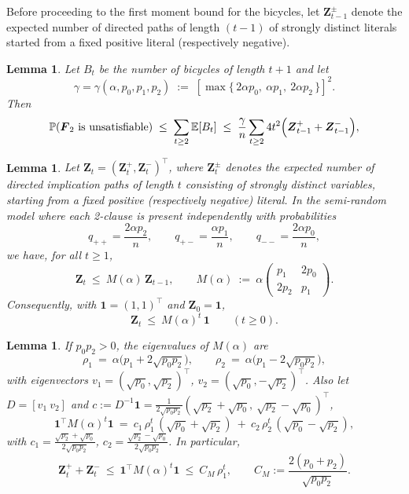 \documentclass[11pt,reqno]{amsart}
\numberwithin{equation}{section}
\renewcommand{\vec}[1]{\boldsymbol{#1}}
\newcommand\vF{\vec F}
\newcommand\vZ{\vec Z}
\newcommand\Erw{\mathbb{E}}
\newcommand\ex{\Erw}
\newcommand\pr{\mathbb{P}}
\renewcommand\Pr{\pr}
\newtheorem{lemma}[definition]{Lemma}
\def\pr{{\mathbb P}}
\begin{document}
Before proceeding to the first moment bound for the bicycles, let $\vZ^\pm_{t-1}$ denote the expected number of directed paths of length $\left(t-1\right)$ of strongly distinct literals started from a fixed positive literal (respectively negative).
\begin{lemma}\label{lem:hooked-count}
	Let $B_t$ be the number of bicycles of length $t+1$ 
	and let
	\[
	\gamma=\gamma(\alpha,p_0,p_1,p_2)\;:=\;[\max\{\,2\alpha p_0,\ \alpha p_1,\ 2\alpha p_2\,\}]^2.
	\]
	Then
	\[
	\Pr(\text{$\vF_2$ is unsatisfiable}) \;\le\; \sum_{t\ge 2}\ex[ B_t]
	\;\le\; 
	\frac{\gamma}{n}\sum_{t\ge 2}4t^2\Bigl(\vZ^+_{t-1}+\vZ^-_{t-1}\Bigr),
	\]
\end{lemma}
\begin{lemma}\label{lem_sen}
	Let $\vZ_t=(\vZ_t^+,\vZ_t^-)^\top$, where $\vZ_t^\pm$ denotes the expected number of
	directed implication paths of length $t$ consisting of \emph{strongly distinct}
	variables, starting from a fixed positive (respectively negative) literal.
	In the semi-random model where each 2-clause is present independently with probabilities
	\[
	q_{++}=\frac{2\alpha p_2}{n},\qquad
	q_{+-}=\frac{\alpha p_1}{n},\qquad
	q_{--}=\frac{2\alpha p_0}{n},
	\]
	we have, for all $t\ge 1$,
	\[
	\vZ_t \ \le\ M(\alpha)\,\vZ_{t-1},\qquad
	M(\alpha)\ :=\ \alpha\begin{pmatrix} p_1 & 2p_0\\[2pt] 2p_2 & p_1\end{pmatrix}.
	\]
	Consequently, with $\mathbf 1=(1,1)^\top$ and $\vZ_0=\mathbf 1$,
	\[
	\vZ_t\ \le\ M(\alpha)^t\,\mathbf 1\qquad (t\ge 0).
	\]
\end{lemma}
\begin{lemma}\label{lem:explicit-eigs}
	If $p_0p_2>0$, the eigenvalues of $M(\alpha)$ are
	\[
	\rho_1\ =\ \alpha\bigl(p_1+2\sqrt{p_0p_2}\bigr),\qquad
	\rho_2\ =\ \alpha\bigl(p_1-2\sqrt{p_0p_2}\bigr),
	\]
	with eigenvectors \(v_1=(\sqrt{p_0},\sqrt{p_2})^\top\), \(v_2=(\sqrt{p_0},-\sqrt{p_2})^\top\).
	Also let \(D=[v_1\ v_2]\) and \(c:=D^{-1}\mathbf{1}=\frac{1}{2\sqrt{p_0p_2}}(\sqrt{p_2}+\sqrt{p_0},\ \sqrt{p_2}-\sqrt{p_0})^\top\),
	\[
	\mathbf{1}^\top M(\alpha)^t\mathbf{1}
	\ =\ c_1\,\rho_1^{t}\,(\sqrt{p_0}+\sqrt{p_2})\ +\ c_2\,\rho_2^{t}\,(\sqrt{p_0}-\sqrt{p_2}),
	\]
	with \(c_1=\frac{\sqrt{p_2}+\sqrt{p_0}}{2\sqrt{p_0p_2}}\), \(c_2=\frac{\sqrt{p_2}-\sqrt{p_0}}{2\sqrt{p_0p_2}}\).
	In particular,
	\begin{equation}\label{eq:Mt1MtBound}
		\vZ^+_{t}+\vZ^-_{t}\ \le\ \mathbf{1}^\top M(\alpha)^t\mathbf{1}
		\ \le\ C_M\,\rho_1^t,\qquad
		C_M:=\frac{2(p_0+p_2)}{\sqrt{p_0p_2}}.
	\end{equation}
\end{lemma}
\end{document}
